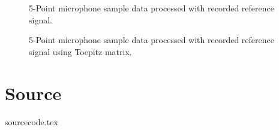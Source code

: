\documentclass[final]{scrreprt} %
\begin{document}
\begin{appendices}
\begin{figure}[H]
	\centering
	\setlength\figureheight{3cm}
    	\setlength{}
	
	\caption{5-Point microphone sample data processed with recorded reference signal.}
	\label{fig:no-toep}
\end{figure}

\begin{figure}[H]
	\centering
	\setlength\figureheight{3cm}
    	\setlength{}
	
	\caption{5-Point microphone sample data processed with recorded reference signal using Toepitz matrix.}
	\label{fig:toep}
\end{figure}

\chapter{Source}
\label{app:source}
{sourcecode.tex}

\end{appendices}
\end{document}
